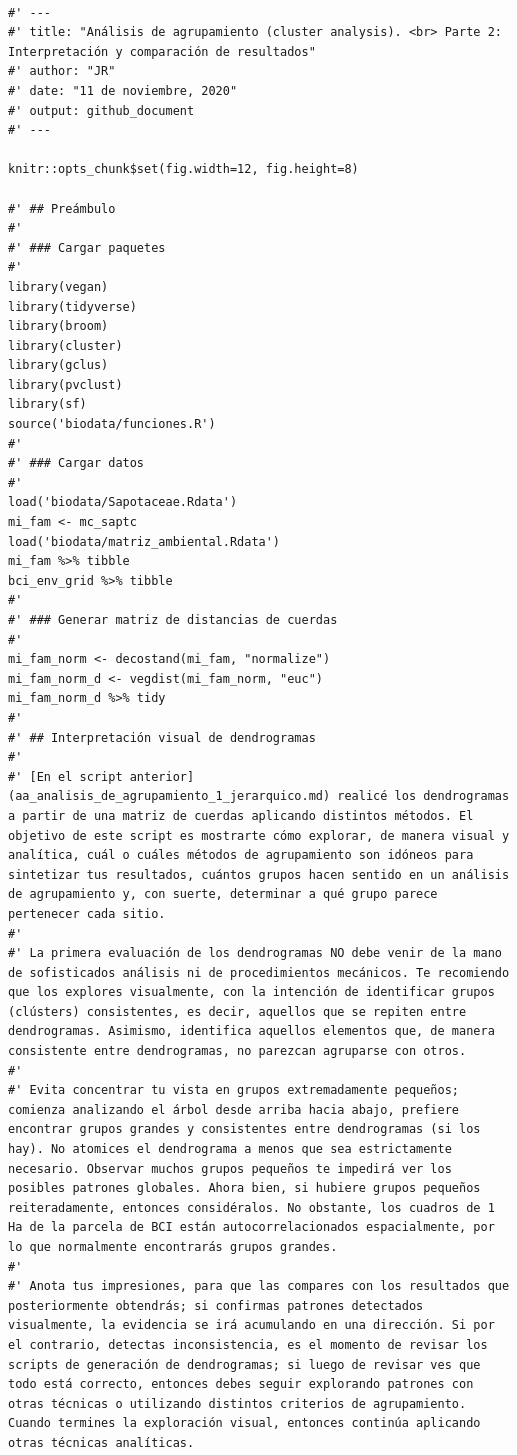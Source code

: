 \documentclass[11pt,]{article}
\begin{document}
\begin{verbatim}

#' ---
#' title: "Análisis de agrupamiento (cluster analysis). <br> Parte 2: Interpretación y comparación de resultados"
#' author: "JR"
#' date: "11 de noviembre, 2020"
#' output: github_document
#' ---

knitr::opts_chunk$set(fig.width=12, fig.height=8)

#' ## Preámbulo
#' 
#' ### Cargar paquetes
#' 
library(vegan)
library(tidyverse)
library(broom)
library(cluster)
library(gclus)
library(pvclust)
library(sf)
source('biodata/funciones.R')
#' 
#' ### Cargar datos
#' 
load('biodata/Sapotaceae.Rdata')
mi_fam <- mc_saptc
load('biodata/matriz_ambiental.Rdata')
mi_fam %>% tibble
bci_env_grid %>% tibble
#' 
#' ### Generar matriz de distancias de cuerdas
#' 
mi_fam_norm <- decostand(mi_fam, "normalize")
mi_fam_norm_d <- vegdist(mi_fam_norm, "euc")
mi_fam_norm_d %>% tidy
#' 
#' ## Interpretación visual de dendrogramas
#' 
#' [En el script anterior](aa_analisis_de_agrupamiento_1_jerarquico.md) realicé los dendrogramas a partir de una matriz de cuerdas aplicando distintos métodos. El objetivo de este script es mostrarte cómo explorar, de manera visual y analítica, cuál o cuáles métodos de agrupamiento son idóneos para sintetizar tus resultados, cuántos grupos hacen sentido en un análisis de agrupamiento y, con suerte, determinar a qué grupo parece pertenecer cada sitio.
#' 
#' La primera evaluación de los dendrogramas NO debe venir de la mano de sofisticados análisis ni de procedimientos mecánicos. Te recomiendo que los explores visualmente, con la intención de identificar grupos (clústers) consistentes, es decir, aquellos que se repiten entre dendrogramas. Asimismo, identifica aquellos elementos que, de manera consistente entre dendrogramas, no parezcan agruparse con otros.
#' 
#' Evita concentrar tu vista en grupos extremadamente pequeños; comienza analizando el árbol desde arriba hacia abajo, prefiere encontrar grupos grandes y consistentes entre dendrogramas (si los hay). No atomices el dendrograma a menos que sea estrictamente necesario. Observar muchos grupos pequeños te impedirá ver los posibles patrones globales. Ahora bien, si hubiere grupos pequeños reiteradamente, entonces considéralos. No obstante, los cuadros de 1 Ha de la parcela de BCI están autocorrelacionados espacialmente, por lo que normalmente encontrarás grupos grandes.
#' 
#' Anota tus impresiones, para que las compares con los resultados que posteriormente obtendrás; si confirmas patrones detectados visualmente, la evidencia se irá acumulando en una dirección. Si por el contrario, detectas inconsistencia, es el momento de revisar los scripts de generación de dendrogramas; si luego de revisar ves que todo está correcto, entonces debes seguir explorando patrones con otras técnicas o utilizando distintos criterios de agrupamiento. Cuando termines la exploración visual, entonces continúa aplicando otras técnicas analíticas.

\end{verbatim}
\end{document}
